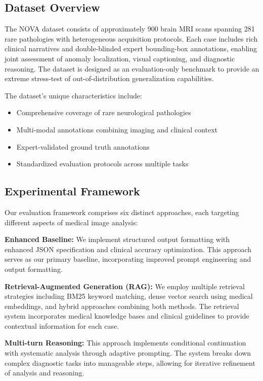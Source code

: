 \documentclass[runningheads]{llncs}
\begin{document}
\subsection{Dataset Overview}

The NOVA dataset consists of approximately 900 brain MRI scans spanning 281 rare pathologies with heterogeneous acquisition protocols. Each case includes rich clinical narratives and double-blinded expert bounding-box annotations, enabling joint assessment of anomaly localization, visual captioning, and diagnostic reasoning. The dataset is designed as an evaluation-only benchmark to provide an extreme stress-test of out-of-distribution generalization capabilities.

The dataset's unique characteristics include:
\begin{itemize}
\item Comprehensive coverage of rare neurological pathologies
\item Multi-modal annotations combining imaging and clinical context
\item Expert-validated ground truth annotations
\item Standardized evaluation protocols across multiple tasks
\end{itemize}

\subsection{Experimental Framework}

Our evaluation framework comprises six distinct approaches, each targeting different aspects of medical image analysis:

\textbf{Enhanced Baseline:} We implement structured output formatting with enhanced JSON specification and clinical accuracy optimization. This approach serves as our primary baseline, incorporating improved prompt engineering and output formatting.

\textbf{Retrieval-Augmented Generation (RAG):} We employ multiple retrieval strategies including BM25 keyword matching, dense vector search using medical embeddings, and hybrid approaches combining both methods. The retrieval system incorporates medical knowledge bases and clinical guidelines to provide contextual information for each case.

\textbf{Multi-turn Reasoning:} This approach implements conditional continuation with systematic analysis through adaptive prompting. The system breaks down complex diagnostic tasks into manageable steps, allowing for iterative refinement of analysis and reasoning.
\end{document}
